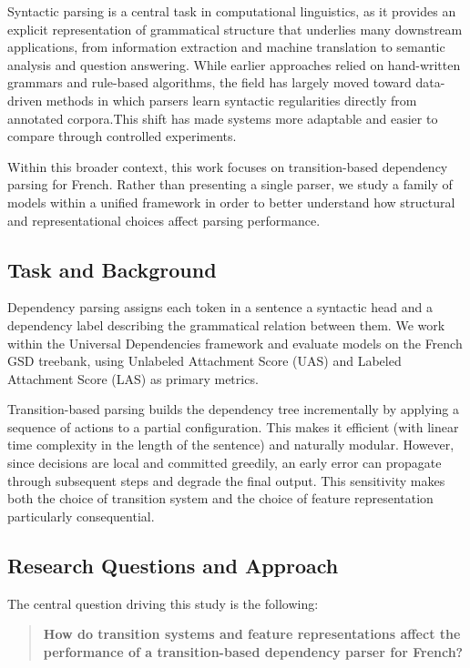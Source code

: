 \documentclass[12pt,letterpaper]{article}
\begin{document}
Syntactic parsing is a central task in computational linguistics, as it provides an explicit representation of grammatical structure that underlies many downstream applications, from information extraction and machine translation to semantic analysis and question answering. While earlier approaches relied on hand-written grammars and rule-based algorithms, the field has largely moved toward data-driven methods in which parsers learn syntactic regularities directly from annotated corpora.This shift has made systems more adaptable and easier to compare through controlled experiments.

Within this broader context, this work focuses on transition-based dependency parsing for French. Rather than presenting a single parser, we study a family of models within a unified framework in order to better understand how structural and representational choices affect parsing performance.

\subsection{Task and Background}
\label{subsec:task_motivation}

Dependency parsing assigns each token in a sentence a syntactic head and a dependency label describing the grammatical relation between them. We work within the Universal Dependencies framework and evaluate models on the French GSD treebank, using Unlabeled Attachment Score (UAS) and Labeled Attachment Score (LAS) as primary metrics.

Transition-based parsing builds the dependency tree incrementally by applying a sequence of actions to a partial configuration. This makes it efficient (with linear time complexity in the length of the sentence) and naturally modular. However, since decisions are local and committed greedily, an early error can propagate through subsequent steps and degrade the final output. This sensitivity makes both the choice of transition system and the choice of feature representation particularly consequential.

\subsection{Research Questions and Approach}
\label{subsec:research_question}

The central question driving this study is the following:

\begin{quote}
\textbf{How do transition systems and feature representations affect the performance of a transition-based dependency parser for French?}
\end{quote}
\end{document}
